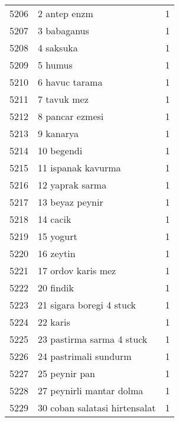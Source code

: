 \begin{tabular}{llr}
5206 &                                       2 antep enzm &      1 \\
5207 &                                        3 babaganus &      1 \\
5208 &                                          4 saksuka &      1 \\
5209 &                                            5 humus &      1 \\
5210 &                                     6 havuc tarama &      1 \\
5211 &                                        7 tavuk mez &      1 \\
5212 &                                    8 pancar ezmesi &      1 \\
5213 &                                          9 kanarya &      1 \\
5214 &                                         10 begendi &      1 \\
5215 &                                 11 ispanak kavurma &      1 \\
5216 &                                    12 yaprak sarma &      1 \\
5217 &                                    13 beyaz peynir &      1 \\
5218 &                                           14 cacik &      1 \\
5219 &                                          15 yogurt &      1 \\
5220 &                                          16 zeytin &      1 \\
5221 &                                 17 ordov karis mez &      1 \\
5222 &                                          20 findik &      1 \\
5223 &                           21 sigara boregi 4 stuck &      1 \\
5224 &                                           22 karis &      1 \\
5225 &                          23 pastirma sarma 4 stuck &      1 \\
5226 &                              24 pastrimali sundurm &      1 \\
5227 &                                      25 peynir pan &      1 \\
5228 &                           27 peynirli mantar dolma &      1 \\
5229 &                      30 coban salatasi hirtensalat &      1 \\

\end{tabular}
